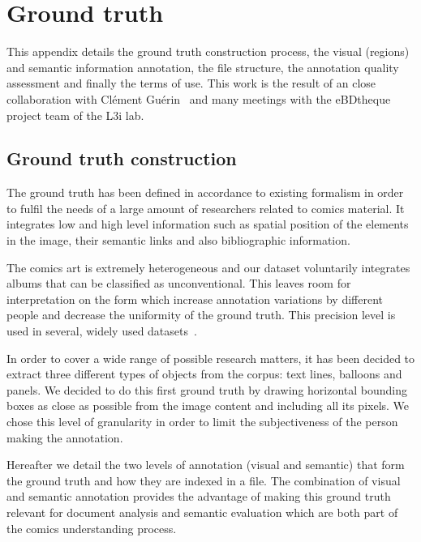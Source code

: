 \chapter{Ground truth}
\label{app:groundtruth}
\graphicspath{{./chapters/Appendix/figs/}}

This appendix details the ground truth construction process, the visual (regions) and semantic information annotation, the file structure, the annotation quality assessment and finally the terms of use.
This work is the result of an close collaboration with Cl{\'e}ment Gu{\'e}rin~\cite{phdthesisGuerin14} and many meetings with the eBDtheque project team of the L3i lab.


\section{Ground truth construction} %
\label{sec:ground_truth_construction}

The ground truth has been defined in accordance to existing formalism in order to fulfil the needs of a large amount of researchers related to comics material.
It integrates low and high level information such as spatial position of the elements in the image, their semantic links and also bibliographic information.


The comics art is extremely heterogeneous and our dataset voluntarily integrates albums that can be classified as
unconventional.
This leaves room for interpretation on the form which increase annotation variations by different people and decrease the uniformity of the ground truth.
This precision level is used in several, widely used datasets~\cite{pascal-voc-2012, yao2007introduction}.

In order to cover a wide range of possible research matters, it has been decided to extract three different types of objects from the corpus: text lines, balloons and panels.
We decided to do this first ground truth by drawing horizontal bounding boxes as close as possible from the image content and including all its pixels.
We chose this level of granularity in order to limit the subjectiveness of the person making the annotation.

Hereafter we detail the two levels of annotation (visual and semantic) that form the ground truth and how they are indexed in a file.
The combination of visual and semantic annotation provides the advantage of making this ground truth relevant for document analysis and semantic evaluation which are both part of the comics understanding process.

